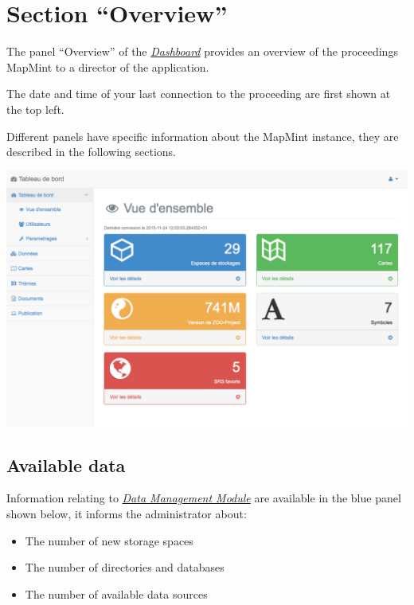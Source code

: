 \documentclass[letterpaper,10pt,english]{sphinxmanual}
\begin{document}
\section{Section ``Overview''}
\label{dashboard/overview::doc}\label{dashboard/overview:section-vue-d-ensemble}\label{dashboard/overview:dashboard-overview}
The panel ``Overview'' of the {\hyperref[dashboard/index::doc]{\emph{\emph{Dashboard}}}} provides an overview of the proceedings MapMint to a director of the application.

The date and time of your last connection to the proceeding are first shown at the top left.

Different panels have specific information about the MapMint instance, they are described in the following sections.

\includegraphics[width=1.000\linewidth]{dashboard-module-preview.png}


\subsection{Available data}
\label{dashboard/overview:donnees-disponibles}
Information relating to {\hyperref[data/index::doc]{\emph{\emph{Data Management Module}}}} are available in the blue panel shown below, it informs the administrator about:
\begin{itemize}
\item {} 
The number of new storage spaces

\item {} 
The number of directories and databases

\item {} 
The number of available data sources

\end{itemize}
\end{document}
